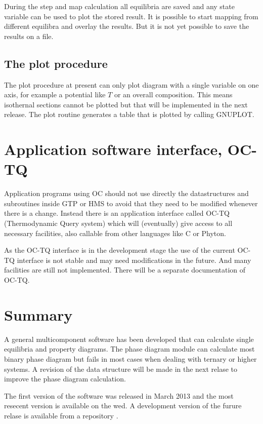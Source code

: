 \documentclass[12pt]{article}
\begin{document}
During the step and map calculation all equilibria are saved and any
state variable can be used to plot the stored result.  It is possible
to start mapping from different equilibra and overlay the results.
But it is not yet possible to save the results on a file.

\subsection{The plot procedure}

The plot procedure at present can only plot diagram with a single
variable on one axis, for example a potential like $T$ or an overall
composition.  This means isothernal sections cannot be plotted but
that will be implemented in the next release.  The plot routine
generates a table that is plotted by calling GNUPLOT.

\section{Application software interface, OC-TQ}

Application programs using OC should not use directly the
datastructures and subroutines inside GTP or HMS to avoid that they
need to be modified whenever there is a change.  Instead there is an
application interface called OC-TQ (Thermodynamic Query system) which
will (eventually) give access to all necessary facilities, also
callable from other languages like C or Phyton.

As the OC-TQ interface is in the development stage the use of the
current OC-TQ interface is not stable and may need modifications in
the future.  And many facilities are still not implemented.  There
will be a separate documentation of OC-TQ.

\section{Summary}

A general multicomponent software has been developed that can
calculate single equilibria and property diagrams.  The phase diagram
module can calculate most binary phase diagram but fails in most cases
when dealing with ternary or higher systems.  A revision of the data
structure will be made in the next relase to improve the phase diagram
calculation.

The first version of the software was released in March 2013 and the
most resecent version is available on the wed\cite{ocweb}.  A
development version of the furure relase is available from a
repository \cite{github}.
\end{document}
